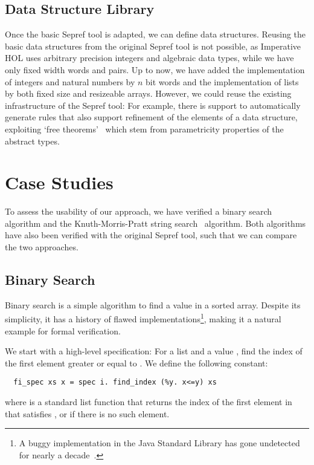 \documentclass[a4paper,USenglish,cleveref, autoref]{lipics-v2019}
\begin{document}
\subsection{Data Structure Library}
Once the basic Sepref tool is adapted, we can define data structures. 
Reusing the basic data structures from the original Sepref tool is not possible, as Imperative HOL 
uses arbitrary precision integers and algebraic data types, while we have only fixed width words and pairs.
Up to now, we have added the implementation of integers and natural numbers 
by $n$ bit words and the implementation of lists by both fixed size and resizeable arrays.
However, we could reuse the existing infrastructure of the Sepref tool: For example,
there is support to automatically generate rules that also support refinement of the elements of a data structure, 
exploiting `free theorems'~\cite{Wad89} which stem from parametricity properties of the abstract types.

\section{Case Studies}\label{sec:casestudies}
To assess the usability of our approach, we have verified a binary search algorithm and 
the Knuth-Morris-Pratt string search~\cite{KMP77} algorithm. 
Both algorithms have also been verified with the original Sepref tool, such that we can compare the two approaches.

\subsection{Binary Search}
Binary search is a simple algorithm to find a value in a sorted array. 
Despite its simplicity, it has a history of flawed implementations\footnote{A buggy implementation in the Java Standard Library has gone undetected for nearly a decade~\cite{bs_flaw_blogpost}.}, making it a natural example for formal verification.

We start with a high-level specification: For a list  and a value , find the index of the first element greater or equal to .
We define the following constant:
\begin{lstlisting}
  fi_spec xs x = spec i. find_index (%y. x<=y) xs
\end{lstlisting}
where  is a standard list function that returns the index of the 
first element in  that satisfies , or  if there is no such element.
\end{document}
